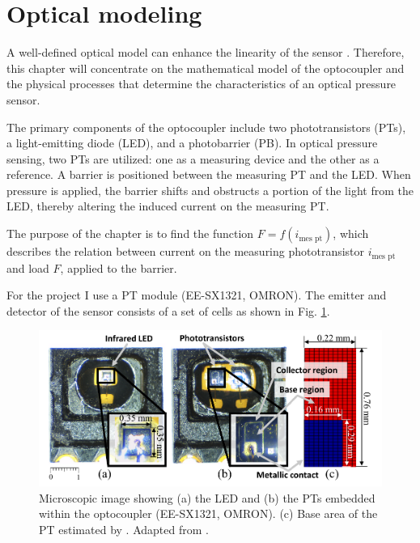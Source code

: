 \section{Optical modeling}
\label{section:optical_modeling}
A well-defined optical model can enhance the linearity of the sensor \cite{my_love_pressure_photosensor}. Therefore, this chapter will concentrate on the mathematical model of the optocoupler and the physical processes that determine the characteristics of an optical pressure sensor.

The primary components of the optocoupler include two phototransistors (PTs), a light-emitting diode (LED), and a photobarrier (PB). 
In optical pressure sensing, two PTs are utilized: one as a measuring device and the other as a reference. 
A barrier is positioned between the measuring PT and the LED. 
When pressure is applied, the barrier shifts and obstructs a portion of the light from the LED, thereby altering the induced current on the measuring PT.

The purpose of the chapter is to find the function $F = f(i_{\text{mes pt}})$, which describes the relation between current on the measuring phototransistor $i_{\text{mes pt}}$ and load $F$, applied to the barrier.

For the project I use a PT module (EE-SX1321, OMRON). 
The emitter and detector of the sensor consists of a set of cells as shown in Fig. \ref{fig:microscopic_image}.

\begin{figure}[H]
  \includegraphics[width=\textwidth]{figs/Microscopic_image.png}
    \centering
    \caption{ Microscopic image showing (a) the LED and (b) the PTs embedded within the optocoupler (EE-SX1321, OMRON). 
    (c) Base area of the PT estimated by \cite[Fig. 4]{my_love_pressure_photosensor}.
    Adapted from \cite[Fig. 4]{my_love_pressure_photosensor}.}
    \label{fig:microscopic_image}
\end{figure}

